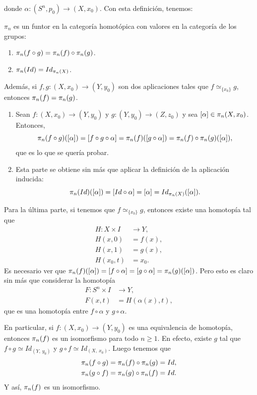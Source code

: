 donde $\alpha : (S^n, p_0) \longrightarrow (X, x_0)$.
Con esta definición, tenemos:
\begin{prop}
$\pi_n$ es un funtor en la categoría homotópica con valores en la categoría de los grupos:
\begin{enumerate}
\item $\pi_{n}(f \circ g) = \pi_{n}(f) \circ \pi_{n}(g)$.
\item $\pi_{n}(Id) = Id_{\pi_{n}(X)}$.
\end{enumerate}
Además, si $f, g : (X, x_0) \longrightarrow (Y, y_0)$ son dos aplicaciones tales que $f \simeq_{\{x_0\}} g$, entonces $\pi_{n}(f) = \pi_{n}(g)$.
\end{prop}
\begin{demo}
\begin{enumerate}
\item Sean $f: (X, x_0) \longrightarrow (Y, y_0)$ y $g: (Y, y_0) \longrightarrow (Z, z_0)$ y sea $[\alpha] \in \pi_{n}(X, x_0)$. Entonces,
\[
\pi_{n}(f \circ g)([\alpha]) = [f \circ g \circ \alpha] = \pi_{n}(f)([g \circ \alpha]) = \pi_{n}(f) \circ \pi_{n}(g)([\alpha]),
\]
que es lo que se quería probar.
\item Esta parte se obtiene sin más que aplicar la definición de la aplicación inducida:
\[
\pi_{n}(Id)([\alpha]) = [Id \circ \alpha] = [\alpha] = Id_{\pi_{n}(X)}([\alpha]).
\]
\end{enumerate}
Para la última parte, si tenemos que $f \simeq_{\{x_0\}} g$, entonces existe una homotopía tal que
\begin{align*}
H : X \times I &\longrightarrow Y, \\
H(x, 0) &= f(x),\\
H(x, 1) &= g(x), \\
H(x_0, t) &= x_0.
\end{align*}
Es necesario ver que $\pi_{n}(f)([\alpha]) = [ f \circ \alpha]  = [ g \circ \alpha ] = \pi_{n}(g)([\alpha])$. Pero esto es claro sin más que considerar la homotopía
\begin{align*}
F : S^n \times I &\longrightarrow Y, \\
F(x, t) &= H( \alpha(x), t),
\end{align*}
que es una homotopía entre $ f \circ \alpha$ y $ g \circ \alpha$.
\end{demo}

En particular, si $f : (X, x_0) \longrightarrow (Y, y_0)$ es una equivalencia de homotopía, entonces $\pi_{n}(f)$ es un isomorfismo para todo $n \geq 1$. En efecto, existe $g$ tal que $f \circ g \simeq Id_{(Y, \ y_0)}$ y $g \circ f \simeq Id_{(X, \ x_0)}$. 
Luego tenemos que 
\begin{align*}
\pi_{n}(f \circ g) = \pi_{n}(f) \circ \pi_{n}(g) = Id, \\
\pi_{n}(g \circ f) = \pi_{n}(g) \circ \pi_{n}(f) = Id.
\end{align*}
Y así, $\pi_{n}(f)$ es un isomorfismo.

